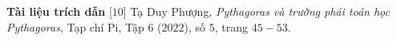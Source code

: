 \begin{multicols}{2}
	\vskip 0.1cm
	\textbf{\color{lichsutoanhoc}Tài liệu trích dẫn}
	\vskip 0.1cm
	[$10$] Tạ Duy Phượng, \textit{Pythagoras và trường phái toán học Pythagoras}, Tạp chí Pi, Tập $6$ ($2022$), số $5$, trang $45-53$.
\end{multicols}